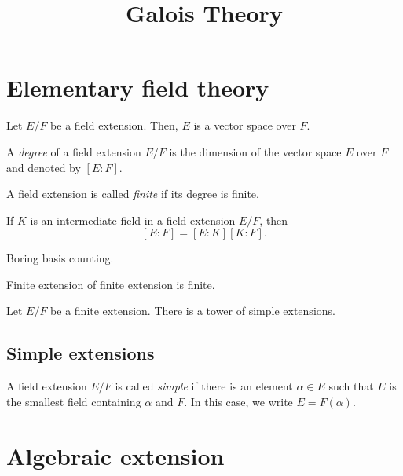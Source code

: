 \documentclass{../exp}
\title{Galois Theory}
\begin{document}
\maketitle

\section{Elementary field theory}

\begin{thm}
Let $E/F$ be a field extension.
Then, $E$ is a vector space over $F$.
\end{thm}

\begin{defn}
A \emph{degree} of a field extension $E/F$ is the dimension of the vector space $E$ over $F$ and denoted by $[E:F]$.
\end{defn}

\begin{defn}
A field extension is called \emph{finite} if its degree is finite.
\end{defn}

\begin{thm}
If $K$ is an intermediate field in a field extension $E/F$, then
\[[E:F]=[E:K][K:F].\]
\end{thm}
\begin{pf}
Boring basis counting.
\end{pf}

\begin{cor}
Finite extension of finite extension is finite.
\end{cor}

\begin{thm}
Let $E/F$ be a finite extension.
There is a tower of simple extensions.
\end{thm}



\subsection{Simple extensions}

\begin{defn}
A field extension $E/F$ is called \emph{simple} if there is an element $\alpha\in E$ such that $E$ is the smallest field containing $\alpha$ and $F$.
In this case, we write $E=F(\alpha)$.
\end{defn}




\section{Algebraic extension}
\end{document}

